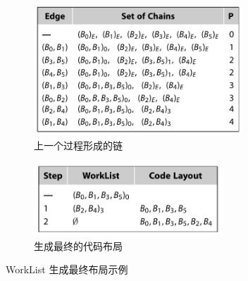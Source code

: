 \begin{figure}[h]
    \begin{subfigure}{0.45\textwidth}
        \centering
        \includegraphics[width=0.86\textwidth]{images/greedy.png}
        \caption{上一个过程形成的链}
    \end{subfigure}
    \begin{subfigure}{0.45\textwidth}
        \centering
        \includegraphics[width=0.78\textwidth]{images/worklist.png}
        \caption{生成最终的代码布局}
    \end{subfigure}
    \caption{WorkList 生成最终布局示例}
\end{figure}